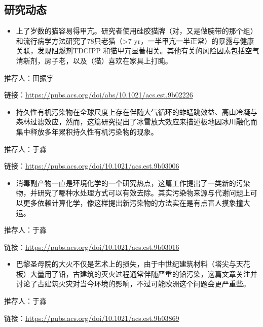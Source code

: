 \documentclass[
]{book}
\providecommand{\tightlist}{%
  \setlength{\itemsep}{0pt}\setlength{\parskip}{0pt}}
\begin{document}
\hypertarget{ux7814ux7a76ux52a8ux6001-20}{%
\subsection*{研究动态}\label{ux7814ux7a76ux52a8ux6001-20}}

\begin{itemize}
\tightlist
\item
  上了岁数的猫容易得甲亢。研究者使用硅胶猫牌（对，又是做腕带的那个组）和流行病学方法研究了78只老猫（\textgreater7 yr，一半甲亢一半正常）的暴露与健康关联，发现阻燃剂TDCIPP 和猫甲亢显著相关。其他有关的风险因素包括空气清新剂，房子老，以及（猫）喜欢在家具上打盹。
\end{itemize}

推荐人：田振宇

链接：\url{https://pubs.acs.org/doi/abs/10.1021/acs.est.9b02226}

\begin{itemize}
\tightlist
\item
  持久性有机污染物在全球尺度上存在伴随大气循环的蚱蜢跳效益、高山冷凝与森林过滤效应，然而，这篇研究提出了冰雪放大效应来描述极地因冰川融化而集中释放多年累积持久性有机污染物的现象。
\end{itemize}

推荐人：于淼

链接：\url{https://pubs.acs.org/doi/10.1021/acs.est.9b03006}

\begin{itemize}
\tightlist
\item
  消毒副产物一直是环境化学的一个研究热点，这篇工作提出了一类新的污染物，并研究了哪种水处理方式可以有效去除。其实污染物来源与代谢问题上可以更多依赖计算化学，像这样提出新污染物的方法实在是有点盲人摸象撞大运。
\end{itemize}

推荐人：于淼

链接：\url{https://pubs.acs.org/doi/10.1021/acs.est.9b03016}

\begin{itemize}
\tightlist
\item
  巴黎圣母院的大火不仅是艺术上的损失，由于中世纪建筑材料（塔尖与天花板）大量用了铅，古建筑的灭火过程通常伴随严重的铅污染，这篇文章关注并讨论了古建筑火灾对当今环境的影响，不过可能欧洲这个问题会更严重些。
\end{itemize}

推荐人：于淼

链接：\url{https://pubs.acs.org/doi/10.1021/acs.est.9b03869}
\end{document}
